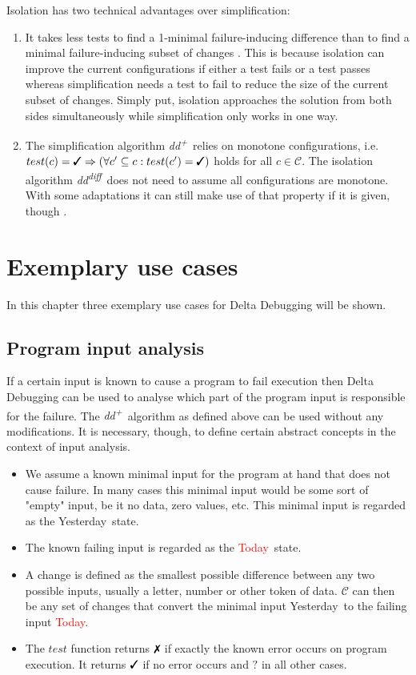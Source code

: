 \documentclass[a4paper,UKenglish]{lipics-v2018}
\newcommand{\ddp}{\textit{dd\textsuperscript{+}}}
\newcommand{\dddiff}{\textit{dd\textsuperscript{diff}}}
\newcommand{\green}[1]{\textcolor{td-green}{#1}}
\newcommand{\red}[1]{\textcolor{red}{#1}}
\newcommand{\yd}[0]{\green{Yesterday}}
\newcommand{\td}[0]{\red{Today}}
\newcommand{\C}[0]{\ensuremath{\mathcal{C}}}
\newcommand{\cmark}{\text{\ding{51}}}
\newcommand{\xmark}{\text{\ding{55}}}
\newcommand{\qmark}{\textbf{?}}
\begin{document}
Isolation has two technical advantages over simplification:
\begin{enumerate}
	\item It takes less tests to find a 1-minimal failure-inducing difference than to find a minimal failure-inducing subset of changes \cite{Zeller:2002:SIF:506201.506206}.
	This is because isolation can improve the current configurations if either a test fails or a test passes whereas simplification needs a test to fail to reduce the size of the current subset of changes. Simply put, isolation approaches the solution from both sides simultaneously while simplification only works in one way.
	\item The simplification algorithm \ddp\ relies on monotone configurations, i.e. $test(c)=\cmark \Rightarrow (\forall c' \subseteq c : test(c') = \cmark)$ holds for all $c \in \C$. The isolation algorithm \dddiff\ does not need to assume all configurations are monotone. With some adaptations it can still make use of that property if it is given, though \cite{Zeller:2002:SIF:506201.506206}.
\end{enumerate}

\section{Exemplary use cases}
\label{sec:use_cases}

In this chapter three exemplary use cases for Delta Debugging will be shown.

\subsection{Program input analysis}

If a certain input is known to cause a program to fail execution then Delta Debugging can be used to analyse which part of the program input is responsible for the failure. The \ddp\ algorithm as defined above can be used without any modifications. It is necessary, though, to define certain abstract concepts in the context of input analysis.\\
\begin{itemize}
  	\item We assume a known minimal input for the program at hand that does not cause failure. In many cases this minimal input would be some sort of "empty" input, be it no data, zero values, etc. This minimal input is regarded as the \yd\ state.
  	\item The known failing input is regarded as the \td\ state.
  	\item A change is defined as the smallest possible difference between any two possible inputs, usually a letter, number or other token of data. $\C$ can then be any set of changes that convert the minimal input \yd\ to the failing input \td.
  	\item The $test$ function returns $\xmark$ if exactly the known error occurs on program execution. It returns $\cmark$ if no error occurs and $\qmark$ in all other cases. 
\end{itemize}
\end{document}
